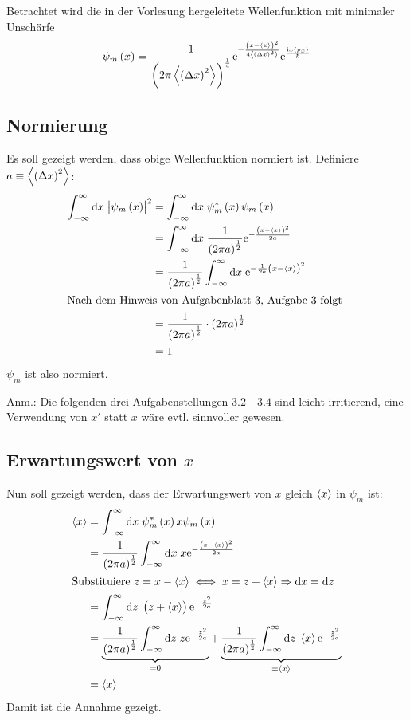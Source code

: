 Betrachtet wird die in der Vorlesung hergeleitete Wellenfunktion mit minimaler Unschärfe
\[
	\psi_m\del{x}=\frac1{\del{2\pi\mw{\del{\Delta x}^2}}^{\frac14}}\ee^{-\frac{\del{x-\mw{x}}^2}{4\mw{\del{\Delta x}^2}}}
	\ee^{\frac{\ii x\mw{p_x}}{\hbar}}
\]

\subsection{Normierung}

Es soll gezeigt werden, dass obige Wellenfunktion normiert ist. Definiere $a\equiv\mw{\del{\Delta x}^2}$:
\begin{align*}
	\ui{x}\abs{\psi_m\del{x}}^2&=\ui{x}\psi_m^*\del{x}\psi_m\del{x}\\
	&=\ui{x}\frac1{\del{2\pi a}^{\frac12}}\ee^{-\frac{\del{x-\mw{x}}^2}{2a}}\\
	&=\frac1{\del{2\pi a}^{\frac12}}\ui{x}\ee^{-\frac1{2a}\del{x-\mw{x}}^2}\\
	\intertext{%
		Nach dem Hinweis von Aufgabenblatt 3, Aufgabe 3 folgt
	}
	&=\frac1{\del{2\pi a}^{\frac12}}\cdot\del{2\pi a}^{\frac12}\\
	&=1
\end{align*}
$\psi_m$ ist also normiert.

 Anm.: Die folgenden drei Aufgabenstellungen $3.2$ - $3.4$ sind leicht irritierend, eine Verwendung von $x'$ statt $x$ wäre evtl. sinnvoller gewesen.

\subsection{Erwartungswert von $x$}

Nun soll gezeigt werden, dass der Erwartungswert von $x$ gleich $\left\langle x\right\rangle$ in $\psi_m$ ist: 
\begin{align*}
	\mw{x}&=\ui{x}\psi_m^*\del{x}x\psi_m\del{x}\\
	&=\frac1{\del{2\pi a}^{\frac12}}\ui{x}x\ee^{-\frac{\del{x-\mw{x}}^2}{2a}}\\
	\intertext{%
		Substituiere $z=x-\mw{x}\iff x=z+\mw{x}\Rightarrow\dif x=\dif z$ 
	}
	&=\ui{z}\del{z+\mw{x}}\ee^{-\frac{z^2}{2a}}\\
	&=\underbrace{\frac1{\del{2\pi a}^{\frac12}}\ui{z}z\ee^{-\frac{z^2}{2a}}}_{=0}
	+\underbrace{\frac1{\del{2\pi a}^{\frac12}}\ui{z}\mw{x}\ee^{-\frac{z^2}{2a}}}_{=\mw{x}}\\
	&=\mw{x}
\end{align*}
Damit ist die Annahme gezeigt.


